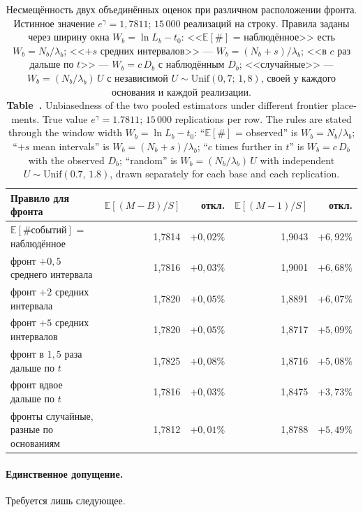 \documentclass[11pt,a4paper]{article}
\newcommand{\encaptab}[1]{\\[3pt]\foreignlanguage{english}{%
  \textbf{Table~\thetable.} #1}}
\theoremstyle{plain}
\theoremstyle{remark}
\newcommand{\eg}{e^{\gamma}}
\begin{document}
\begin{table}[t]
\centering
\caption{Несмещённость двух объединённых оценок при различном расположении фронта.
Истинное значение $\eg=1{,}7811$; $15\,000$ реализаций на строку.
Правила заданы через ширину окна $W_b=\ln L_b-t_0$: <<$\mathbb E[\#]$ = наблюдённое>>
есть $W_b=N_b/\lambda_b$; <<$+s$ средних интервалов>> --- $W_b=(N_b+s)/\lambda_b$;
<<в $c$ раз дальше по $t$>> --- $W_b=c\,D_b$ с наблюдённым $D_b$; <<случайные>> ---
$W_b=(N_b/\lambda_b)\,U$ с независимой $U\sim\mathrm{Unif}(0{,}7;\,1{,}8)$, своей
у каждого основания и каждой реализации.
\encaptab{Unbiasedness of the two pooled estimators under different frontier
placements. True value $\eg=1.7811$; $15\,000$ replications per row. The rules are
stated through the window width $W_b=\ln L_b-t_0$: ``$\mathbb E[\#]$ = observed'' is
$W_b=N_b/\lambda_b$; ``$+s$ mean intervals'' is $W_b=(N_b+s)/\lambda_b$; ``$c$ times
further in $t$'' is $W_b=c\,D_b$ with the observed $D_b$; ``random'' is
$W_b=(N_b/\lambda_b)\,U$ with independent $U\sim\mathrm{Unif}(0.7,\,1.8)$, drawn
separately for each base and each replication.}}
\label{tab:frontier}
\small
\begin{tabular}{lrrrr}
\toprule
Правило для фронта & $\mathbb E[(M{-}B)/S]$ & откл. & $\mathbb E[(M{-}1)/S]$ & откл.\\
\midrule
$\mathbb E[\#\text{событий}]$ = наблюдённое & 1{,}7814 & $+0{,}02\%$ & 1{,}9043 & $+6{,}92\%$\\
фронт $+0{,}5$ среднего интервала & 1{,}7816 & $+0{,}03\%$ & 1{,}9001 & $+6{,}68\%$\\
фронт $+2$ средних интервала & 1{,}7820 & $+0{,}05\%$ & 1{,}8891 & $+6{,}07\%$\\
фронт $+5$ средних интервалов & 1{,}7820 & $+0{,}05\%$ & 1{,}8717 & $+5{,}09\%$\\
фронт в $1{,}5$ раза дальше по $t$ & 1{,}7825 & $+0{,}08\%$ & 1{,}8716 & $+5{,}08\%$\\
фронт вдвое дальше по $t$ & 1{,}7816 & $+0{,}03\%$ & 1{,}8475 & $+3{,}73\%$\\
фронты случайные, разные по основаниям & 1{,}7812 & $+0{,}01\%$ & 1{,}8788 & $+5{,}49\%$\\
\bottomrule
\end{tabular}
\end{table}

\paragraph{Единственное допущение.} Требуется лишь следующее.
\end{document}
